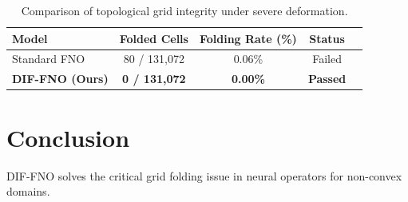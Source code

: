 \documentclass[11pt,a4paper]{article}
\begin{document}
\begin{table}[h]
\centering
\begin{tabular}{lcccc}
\toprule
\textbf{Model} & \textbf{Folded Cells} & \textbf{Folding Rate (\%)} & \textbf{Status} \\
\midrule
Standard FNO & 80 / 131,072 & 0.06\% & Failed \\
\textbf{DIF-FNO (Ours)} & \textbf{0 / 131,072} & \textbf{0.00\%} & \textbf{Passed} \\
\bottomrule
\end{tabular}
\caption{Comparison of topological grid integrity under severe deformation.}
\end{table}

\section{Conclusion}
DIF-FNO solves the critical grid folding issue in neural operators for non-convex domains.
\end{document}

